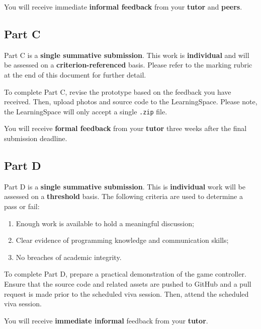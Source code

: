 \documentclass{../fal_assignment}
\begin{document}
You will receive immediate \textbf{informal feedback} from your \textbf{tutor} and \textbf{peers}.

\subsection*{Part C}

Part C is a \textbf{single summative submission}. This work is \textbf{individual} and will be assessed on a \textbf{criterion-referenced} basis. Please refer to the marking rubric at the end of this document for further detail.

To complete Part C, revise the prototype based on the feedback you have received. Then, upload photos and source code to the LearningSpace. Please note, the LearningSpace will only accept a single \texttt{.zip} file.

You will receive \textbf{formal feedback} from your \textbf{tutor} three weeks after the final submission deadline.

\subsection*{Part D}

Part D is a \textbf{single summative submission}. This is \textbf{individual} work will be assessed on a \textbf{threshold} basis. The following criteria are used to determine a pass or fail: 

\begin{enumerate}[label=(\alph*)]
	\item Enough work is available to hold a meaningful discussion; 
	\item Clear evidence of programming knowledge and communication skills; 
	\item No breaches of academic integrity. 
\end{enumerate}

To complete Part D, prepare a practical demonstration of the game controller. Ensure that the source code and related assets are pushed to GitHub and a pull request is made prior to the scheduled viva session. Then, attend the scheduled viva session. 

You will receive \textbf{immediate informal} feedback from your \textbf{tutor}.
\end{document}
